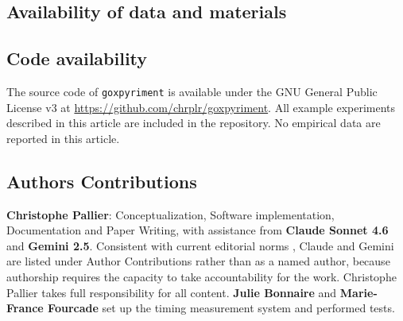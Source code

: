 \documentclass[man,a4paper]{apa7}
\begin{document}
\subsection{Availability of data and materials}

\subsection{Code availability}

The source code of \texttt{goxpyriment} is available under the GNU
General Public License v3 at
\url{https://github.com/chrplr/goxpyriment}. All example experiments
described in this article are included in the repository. No empirical
data are reported in this article.

\subsection{Authors Contributions}\label{author-contributions}

\textbf{Christophe Pallier}: Conceptualization, Software
implementation, Documentation and Paper Writing, with assistance from
\textbf{Claude Sonnet 4.6} and \textbf{Gemini 2.5}. Consistent with
current editorial norms \parencite{natureportfolio2023,
  springernature2023}, Claude and Gemini are listed under Author
Contributions rather than as a named author, because authorship
requires the capacity to take accountability for the work.  Christophe
Pallier takes full responsibility for all content. \textbf{Julie
  Bonnaire} and \textbf{Marie-France Fourcade} set up the timing
measurement system and performed tests.

\clearpage

\printbibliography
\end{document}
